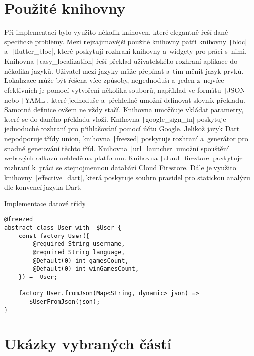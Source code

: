 \section{Použité knihovny}

Při implementaci bylo využito několik knihoven,
které elegantně řeší dané specifické problémy.
Mezi nejzajímavější použité knihovny patří knihovny
\texttt|bloc| a~\texttt|flutter_bloc|,
které poskytují rozhraní knihovny a~widgety pro práci s~nimi.
Knihovna \texttt|easy_localization| řeší překlad uživatelského
rozhraní aplikace do několika jazyků.
Uživatel mezi jazyky může přepínat a~tím měnit jazyk prvků.
Lokalizace může být řešena více způsoby,
nejjednoduší a~jeden z~nejvíce efektivních je pomocí vytvoření několika souborů,
například ve formátu \texttt|JSON| nebo \texttt|YAML|,
které jednoduše a~přehledně umožní definovat slovník překladu.
Samotná definice ovšem ne vždy stačí.
Knihovna umožňuje vkládat parametry, které se do daného překladu vloží.
Knihovna \texttt|google_sign_in| poskytuje jednoduché rozhraní pro
přihlašování pomocí účtu Google.
Jelikož jazyk Dart nepodporuje třídy union,
knihovna \texttt|freezed| poskytuje rozhraní a~generátor pro
snadné generování těchto tříd.
Knihovna \texttt|url_launcher| umožní spouštění webových odkazů
nehledě na platformu.
Knihovna \texttt|cloud_firestore| poskytuje rozhraní k~práci se
stejnojmennou databází Cloud Firestore.
Dále je využito knihovny \texttt|effective_dart|,
která poskytuje souhrn pravidel pro statickou analýzu dle konvencí jazyka Dart.

\begin{listing}[b!]
    \caption{Implementace datové třídy}
    \label{code:implementation-2}
    \begin{verbatim}
@freezed
abstract class User with _$User {
    const factory User({
        @required String username,
        @required String language,
        @Default(0) int gamesCount,
        @Default(0) int winGamesCount,
    }) = _User;

    factory User.fromJson(Map<String, dynamic> json) =>
      _$UserFromJson(json);
}
    \end{verbatim}
\end{listing}

\section{Ukázky vybraných částí}

